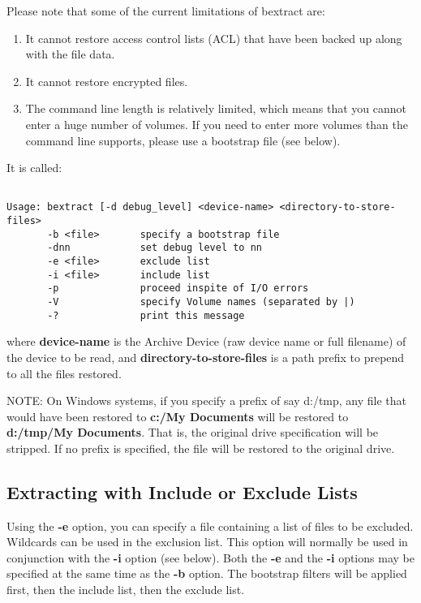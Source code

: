 Please note that some of the current limitations of bextract are:

\begin{enumerate}
\item It cannot restore access control lists (ACL) that have been
      backed up along with the file data.
\item It cannot restore encrypted files.
\item The command line length is relatively limited,
      which means that you cannot enter a huge number of volumes.  If you need to
      enter more volumes than the command line supports, please use a bootstrap
      file (see below).
\end{enumerate}


It is called: 

\footnotesize
\begin{verbatim}
 
Usage: bextract [-d debug_level] <device-name> <directory-to-store-files>
       -b <file>       specify a bootstrap file
       -dnn            set debug level to nn
       -e <file>       exclude list
       -i <file>       include list
       -p              proceed inspite of I/O errors
       -V              specify Volume names (separated by |)
       -?              print this message
\end{verbatim}
\normalsize

where {\bf device-name} is the Archive Device (raw device name or full
filename) of the device to be read, and {\bf directory-to-store-files} is a
path prefix to prepend to all the files restored. 

NOTE: On Windows systems, if you specify a prefix of say d:/tmp, any file that
would have been restored to {\bf c:/My Documents} will be restored to {\bf
d:/tmp/My Documents}. That is, the original drive specification will be
stripped. If no prefix is specified, the file will be restored to the original
drive. 

\subsection{Extracting with Include or Exclude Lists}

Using the {\bf -e} option, you can specify a file containing a list of files
to be excluded. Wildcards can be used in the exclusion list. This option will
normally be used in conjunction with the {\bf -i} option (see below). Both the
{\bf -e} and the {\bf -i} options may be specified at the same time as the
{\bf -b} option. The bootstrap filters will be applied first, then the include
list, then the exclude list. 

